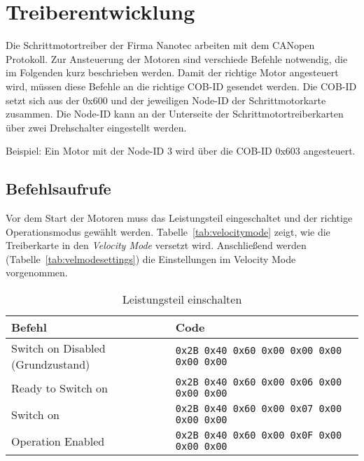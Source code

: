 

\section{Treiberentwicklung}
\label{sec:Treiber}

Die Schrittmotortreiber der Firma Nanotec arbeiten mit dem CANopen Protokoll. Zur Ansteuerung der Motoren sind verschiede Befehle notwendig, die im Folgenden kurz beschrieben werden. Damit der richtige Motor angesteuert wird, müssen diese Befehle an die richtige COB-ID gesendet werden. Die COB-ID setzt sich aus der 0x600 und der jeweiligen Node-ID der Schrittmotorkarte zusammen. Die Node-ID kann an der Unterseite der Schrittmotortreiberkarten über zwei Drehschalter eingestellt werden.

Beispiel:
Ein Motor mit der Node-ID 3 wird über die COB-ID 0x603 angesteuert.


\subsection*{Befehlsaufrufe}

Vor dem Start der Motoren muss das Leistungsteil eingeschaltet und der richtige Operationsmodus gewählt werden. Tabelle~\ref{tab:velocitymode} zeigt, wie die Treiberkarte in den \emph{Velocity Mode} versetzt wird. Anschließend werden (Tabelle~\ref{tab:velmodesettings}) die Einstellungen im Velocity Mode vorgenommen.

\begin{table}[H]
    \begin{tabularx}{\textwidth}{@{}Xl@{}} \toprule


    Befehl & Code \\
    \midrule

    Switch on Disabled (Grundzustand)  &
    \lstinline{0x2B 0x40 0x60 0x00 0x00 0x00 0x00 0x00} \\

    Ready to Switch on  &
    \lstinline{0x2B 0x40 0x60 0x00 0x06 0x00 0x00 0x00} \\

   Switch on  &
    \lstinline{0x2B 0x40 0x60 0x00 0x07 0x00 0x00 0x00} \\

    Operation Enabled  &
    \lstinline{0x2B 0x40 0x60 0x00 0x0F 0x00 0x00 0x00} \\

    \bottomrule
    \end{tabularx}
    \caption{Leistungsteil einschalten}
\end{table}


